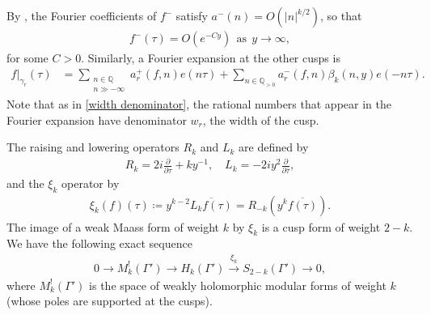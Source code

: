 \documentclass[twoside,a4paper,10pt]{article} %
\newcommand{\dbar}{\frac{\partial}{\partial \bar{\tau}}}
\newcommand{\8}{\infty}
\newcommand{\Q}{\mathbb{Q}}
\theoremstyle{mytheoremstyle}
\theoremstyle{remark}
\numberwithin{equation}{section}
\begin{document}
By \cite[Lemma.~3.4]{BF04}, the Fourier coefficients of $f^-$ satisfy $a^-(n)=O(\vert n \vert^{k/2})$, so that
\begin{align}
f^-(\tau)=O(e^{- C y}) \ \ \textrm{as} \ \ y \rightarrow \8,
\end{align}
for some $C >0$. Similarly, a Fourier expansion at the other cusps is
\begin{align}
f \vert_{\gamma_r}(\tau)& = \sum_{\substack{n \in \Q \\ n \gg -\8}}a^+_r(f,n)e(n\tau) + \sum_{n \in \Q_{>0}} a^-_r(f,n)\beta_k(n,y)e(-n\tau) .
\end{align}
Note that as in \eqref{width denominator}, the rational numbers that appear in the Fourier expansion have denominator $w_r$, the width of the cusp.

The raising and lowering operators $R_k$ and $L_k$ are defined by
\begin{align}
R_k=2i\frac{\partial}{\partial \tau}+ky^{-1}, \quad L_k=-2iy^2\dbar,
\end{align}
and the $\xi_k$ operator by
\begin{align}
\xi_k(f)(\tau) \coloneqq y^{k-2} \overline{L_kf(\tau)}=R_{-k} \left (y^k\overline{f(\tau)} \right ).
\end{align}
The image of a weak Maass form of weight $k$ by $\xi_k$ is a cusp form of weight $2-k$. We have the following exact sequence \cite[Corollary.~3.8]{BF04}
\begin{align}
0 \longrightarrow M^{!}_k(\Gamma') \longrightarrow H_k(\Gamma') \xrightarrow{\ \xi_k\ } S_{2-k}(\Gamma') \longrightarrow 0,
\end{align}
where $M^{!}_k(\Gamma')$ is the space of weakly holomorphic modular forms of weight $k$ (whose poles are supported at the cusps).
\end{document}
